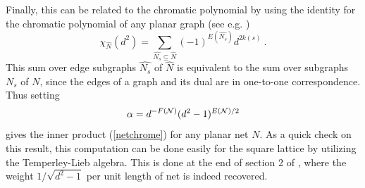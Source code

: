 \documentclass[11pt]{article}
\begin{document}
Finally, this can be related to the chromatic polynomial by using the
identity for the chromatic polynomial of any planar graph (see
e.g. \cite{Bolla})
$$\chi_{\widehat{N}}(d^2) = \sum_{\widehat{N_s}\subseteq \widehat{N}}
\left(-1\right)^{E(\widehat{N_s})} d^{2k(s)}\ .
$$ 
This sum over edge subgraphs $\widehat{N_s}$ of $\widehat{N}$ is
equivalent to the sum over subgraphs $N_s$ of $N$, since the edges of
a graph and its dual are in one-to-one correspondence. Thus setting
\begin{equation}
\alpha = d^{-{F}({\cal N})} (d^2-1)^{E({\cal N})/2}
\label{alphad}
\end{equation}
gives the inner product (\ref{netchrome}) for any planar net $N$. As a
quick check on this result, this computation can be done easily for
the square lattice by utilizing the Temperley-Lieb algebra. This is
done at the end of section 2 of \cite{FJ}, where the weight
$1/\sqrt{d^2-1}$ per unit length of net is indeed recovered.










\def\cmp#1#2#3{Comm.\ Math.\ Phys.\ {\bf #1}, #2 (#3)}
\end{document}
